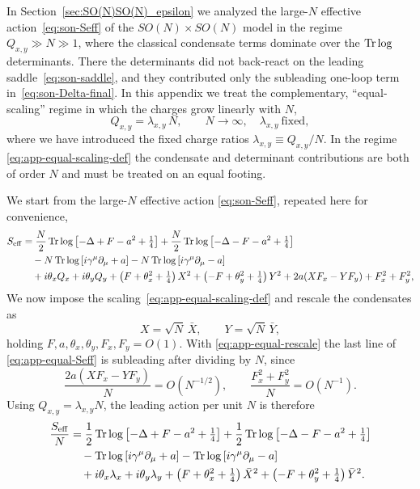 \documentclass[a4paper,11pt]{article}
\begin{document}
\begin{appendix}
In Section~\ref{sec:SO(N)SO(N)_epsilon} we analyzed the large-$N$ effective action~\eqref{eq:son-Seff} of the $SO(N)\times SO(N)$ model in the regime $Q_{x,y}\gg N\gg 1$, where the classical condensate terms dominate over the $\Tr\log$ determinants. There the determinants did not back-react on the leading saddle~\eqref{eq:son-saddle}, and they contributed only the subleading one-loop term in~\eqref{eq:son-Delta-final}. In this appendix we treat the complementary, ``equal-scaling'' regime in which the charges grow linearly with $N$,
\begin{equation}
  Q_{x,y} = \lambda_{x,y}\,N, \qquad N\to\infty,\quad \lambda_{x,y}\ \text{fixed}, \label{eq:app-equal-scaling-def}
\end{equation}
where we have introduced the fixed charge ratios $\lambda_{x,y}\equiv Q_{x,y}/N$. In the regime \eqref{eq:app-equal-scaling-def} the condensate and determinant contributions are both of order $N$ and must be treated on an equal footing.

We start from the large-$N$ effective action \eqref{eq:son-Seff}, repeated here for convenience,
\begin{align}
S_{\rm eff}
&=
\frac{N}{2}\Tr\log\left[-\Delta+F-a^2+\tfrac14\right]
+\frac{N}{2}\Tr\log\left[-\Delta-F-a^2+\tfrac14\right]
\notag\\
&\quad
-N\Tr\log\left[i\gamma^\mu\partial_\mu+a\right]
-N\Tr\log\left[i\gamma^\mu\partial_\mu-a\right]
\notag\\
&\quad
+i\theta_x Q_x+i\theta_y Q_y
+\left(F+\theta_x^2+\tfrac14\right)X^2
+\left(-F+\theta_y^2+\tfrac14\right)Y^2
+2a(XF_x-YF_y)+F_x^2+F_y^2,
\label{eq:app-equal-Seff}
\end{align}
We now impose the scaling~\eqref{eq:app-equal-scaling-def} and rescale the condensates as
\begin{equation}
  X=\sqrt{N}\,\bar{X}, \qquad Y=\sqrt{N}\,\bar{Y}, \label{eq:app-equal-rescale}
\end{equation}
holding $F,a,\theta_x,\theta_y,F_x,F_y=O(1)$. With \eqref{eq:app-equal-rescale} the last line of \eqref{eq:app-equal-Seff} is subleading after dividing by $N$, since
\begin{equation}
  \frac{2a(XF_x-YF_y)}{N}=O(N^{-1/2}),\qquad \frac{F_x^2+F_y^2}{N}=O(N^{-1}). \label{eq:app-equal-subleading}
\end{equation}
Using $Q_{x,y}=\lambda_{x,y}N$, the leading action per unit $N$ is therefore
\begin{align}
\frac{S_{\rm eff}}{N}
&=
\frac12\Tr\log\left[-\Delta+F-a^2+\tfrac14\right]
+\frac12\Tr\log\left[-\Delta-F-a^2+\tfrac14\right]
\notag\\
&\quad
-\Tr\log\left[i\gamma^\mu\partial_\mu+a\right]
-\Tr\log\left[i\gamma^\mu\partial_\mu-a\right]
\notag\\
&\quad
+i\theta_x \lambda_x+i\theta_y \lambda_y
+\left(F+\theta_x^2+\tfrac14\right)\bar{X}^2
+\left(-F+\theta_y^2+\tfrac14\right)\bar{Y}^2.
\label{eq:app-equal-leading}
\end{align}


\end{appendix}
\end{document}
